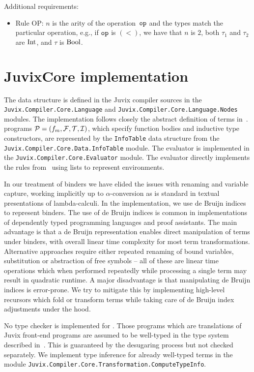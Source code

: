 \documentclass[
    9pt,            %
    techreport,        %
    affiltop,       %
]{art}
\begin{document}
Additional requirements:
\begin{itemize}
\item Rule OP: $n$ is the arity of the operation~$\mathtt{op}$ and the types match
the particular operation, e.g., if $\mathtt{op}$ is $(<)$, we have that $n$ is $2$, both
$\tau_1$ and $\tau_2$ are $\mathrm{Int}$, and $\tau$ is $\mathrm{Bool}$.
\end{itemize}

\section{JuvixCore implementation}\label{sec_core_implementation}

The \JuvixCore{} data structure is defined in the Juvix compiler sources in
the \texttt{Juvix.Compiler.Core.Language} and
\texttt{Juvix.Compiler.Core.Language.Nodes} modules. The implementation
follows closely the abstract definition of terms in~. \JuvixCore{} programs $\mathcal{P} = (f_m,\mathcal{F},\mathcal{T},\mathcal{I})$,
which specify function bodies and inductive type constructors, are
represented by the \texttt{InfoTable} data structure from the
\texttt{Juvix.Compiler.Core.Data.InfoTable} module. The \JuvixCore{} evaluator is implemented in the
\texttt{Juvix.Compiler.Core.Evaluator} module. The evaluator directly
implements the rules from~ using lists to
represent environments. 

In our treatment of binders we have elided the issues with renaming and
variable capture, working implicitly up to $\alpha$-conversion as is
standard in textual presentations of lambda-calculi. In the implementation,
we use de Bruijn indices to represent binders. The use of de Bruijn indices
is common in implementations of dependently typed programming languages and
proof assistants. The main advantage is that a de Bruijn representation
enables direct manipulation of terms under binders, with overall linear
time complexity for most term transformations. Alternative approaches
require either repeated renaming of bound variables, substitution or
abstraction of free symbols -- all of these are linear time operations
which when performed repeatedly while processing a single term may result
in quadratic runtime. A major disadvantage is that manipulating de Bruijn
indices is error-prone. We try to mitigate this by implementing high-level
recursors which fold or transform \JuvixCore{} terms while taking care of
de Bruijn index adjustments under the hood.

No type checker is implemented for \JuvixCore{}. Those
\JuvixCore{} programs which are translations of Juvix front-end programs
are assumed to be well-typed in the type system described in~. This is guaranteed by the desugaring process
but not checked separately. We implement 
type
inference for already well-typed terms in the module
\texttt{Juvix.Compiler.Core.Transformation.ComputeTypeInfo}.
\end{document}
